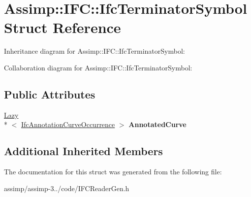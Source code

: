 \hypertarget{struct_assimp_1_1_i_f_c_1_1_ifc_terminator_symbol}{\section{Assimp\+:\+:I\+F\+C\+:\+:Ifc\+Terminator\+Symbol Struct Reference}
\label{struct_assimp_1_1_i_f_c_1_1_ifc_terminator_symbol}
}


Inheritance diagram for Assimp\+:\+:I\+F\+C\+:\+:Ifc\+Terminator\+Symbol\+:


Collaboration diagram for Assimp\+:\+:I\+F\+C\+:\+:Ifc\+Terminator\+Symbol\+:
\subsection*{Public Attributes}
\begin{DoxyCompactItemize}
\item 
\hypertarget{struct_assimp_1_1_i_f_c_1_1_ifc_terminator_symbol_a08ce9cd788cbab4a0289b99ff725ed8a}{\hyperlink{struct_assimp_1_1_s_t_e_p_1_1_lazy}{Lazy}\\*
$<$ \hyperlink{struct_assimp_1_1_i_f_c_1_1_ifc_annotation_curve_occurrence}{Ifc\+Annotation\+Curve\+Occurrence} $>$ {\bfseries Annotated\+Curve}}\label{struct_assimp_1_1_i_f_c_1_1_ifc_terminator_symbol_a08ce9cd788cbab4a0289b99ff725ed8a}

\end{DoxyCompactItemize}
\subsection*{Additional Inherited Members}


The documentation for this struct was generated from the following file\+:\begin{DoxyCompactItemize}
\item 
assimp/assimp-\/3../code/I\+F\+C\+Reader\+Gen.\+h\end{DoxyCompactItemize}
